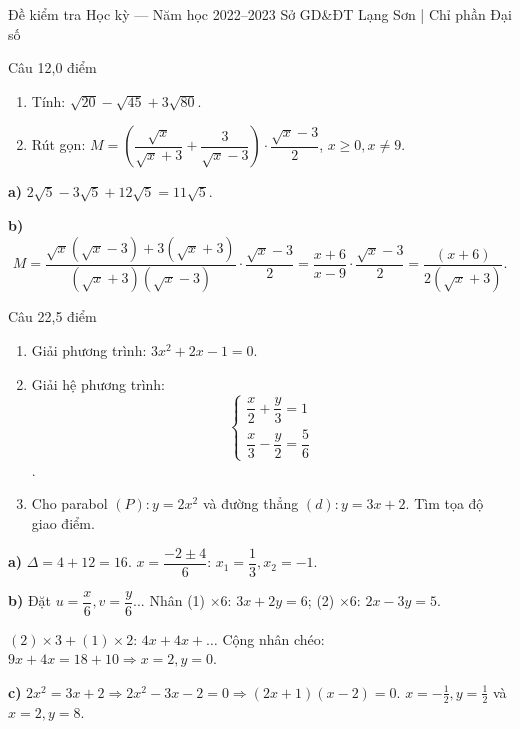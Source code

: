 ﻿%
%
  {Đề kiểm tra Học kỳ — Năm học 2022--2023}%
  {Sở GD\&ĐT Lạng Sơn | Chỉ phần Đại số}

\begin{de_cau}{Câu 1}{2,0 điểm}
\begin{enumerate}[label=\alph*)]
\item Tính: $\sqrt{20}-\sqrt{45}+3\sqrt{80}$.
\item Rút gọn: $M=\left(\dfrac{\sqrt{x}}{\sqrt{x}+3}+\dfrac{3}{\sqrt{x}-3}\right)\cdot\dfrac{\sqrt{x}-3}{2}$, $x\geq 0, x\neq 9$.
\end{enumerate}
\end{de_cau}

\begin{loi_giai_cau}
\textbf{a)} $2\sqrt{5}-3\sqrt{5}+12\sqrt{5}=11\sqrt{5}$.

\textbf{b)}
\[M=\frac{\sqrt{x}(\sqrt{x}-3)+3(\sqrt{x}+3)}{(\sqrt{x}+3)(\sqrt{x}-3)}\cdot\frac{\sqrt{x}-3}{2}
=\frac{x+6}{x-9}\cdot\frac{\sqrt{x}-3}{2}=\frac{(x+6)}{2(\sqrt{x}+3)}.\]
\end{loi_giai_cau}

\begin{de_cau}{Câu 2}{2,5 điểm}
\begin{enumerate}[label=\alph*)]
\item Giải phương trình: $3x^2+2x-1=0$.
\item Giải hệ phương trình: 
\[ \begin{cases}\dfrac{x}{2}+\dfrac{y}{3}=1\\\dfrac{x}{3}-\dfrac{y}{2}=\dfrac{5}{6}\end{cases} \].
\item Cho parabol $(P)\colon y=2x^2$ và đường thẳng $(d)\colon y=3x+2$. Tìm tọa độ giao điểm.
\end{enumerate}
\end{de_cau}

\begin{loi_giai_cau}
\textbf{a)} $\Delta=4+12=16$. $x=\dfrac{-2\pm 4}{6}$: $x_1=\dfrac{1}{3}, x_2=-1$.

\textbf{b)} Đặt $u=\dfrac{x}{6}, v=\dfrac{y}{6}$... Nhân (1) $\times 6$: $3x+2y=6$; (2) $\times 6$: $2x-3y=5$.

$(2)\times 3+(1)\times 2$: $4x+4x+\ldots$ Cộng nhân chéo: $9x+4x=18+10\Rightarrow x=2, y=0$.

\textbf{c)} $2x^2=3x+2\Rightarrow 2x^2-3x-2=0\Rightarrow(2x+1)(x-2)=0$.
$x=-\frac{1}{2},y=\frac{1}{2}$ và $x=2,y=8$.
\end{loi_giai_cau}

